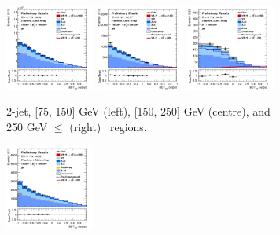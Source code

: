 \begin{figure}[h!]
    \centering
    \begin{subfigure}[b]{\textwidth}
        \centering
        \includegraphics[width=0.32\textwidth]{Images/VH/Own_fit/postfit_VHcc/Region_distmva_BMax150_BMin75_DSR_J2_TTypent_T1_L2_Y6051_GlobalFit_conditionnal_mu1.png}
        \includegraphics[width=0.32\textwidth]{Images/VH/Own_fit/postfit_VHcc/Region_distmva_BMax250_BMin150_DSR_J2_TTypent_T1_L2_Y6051_GlobalFit_conditionnal_mu1.png}
        \includegraphics[width=0.32\textwidth]{Images/VH/Own_fit/postfit_VHcc/Region_distmva_BMin250_DSR_J2_TTypent_T1_L2_Y6051_GlobalFit_conditionnal_mu1.png}
        \caption{2-jet, [75, 150] GeV (left), [150, 250] GeV (centre), and 250  GeV $\leq$ (right) \ptv\ regions.}
        \label{fig:plots_VHcc_2L_SR_1c_2J}
    \end{subfigure}
    \begin{subfigure}[b]{\textwidth}
        \centering
        \includegraphics[width=0.32\textwidth]{Images/VH/Own_fit/postfit_VHcc/Region_distmva_BMax150_BMin75_DSR_J3_TTypent_incJet1_T1_L2_Y6051_GlobalFit_conditionnal_mu1.png}

\end{subfigure}
\end{figure}
